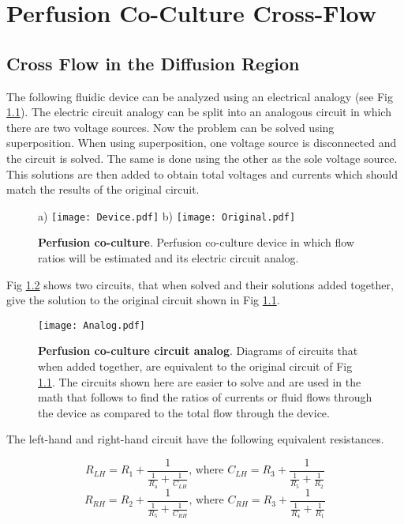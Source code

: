 \chapter{Perfusion Co-Culture Cross-Flow}
\label{App:PerfusionCoCulture}

\section{Cross Flow in the Diffusion Region}
The following fluidic device can be analyzed using an electrical analogy (see Fig \ref{App:PerfusionCulture:fig:device}). The electric circuit analogy can be split into an analogous circuit in which there are two voltage sources. Now the problem can be solved using superposition. When using superposition, one voltage source is disconnected and the circuit is solved. The same is done using the other as the sole voltage source. This solutions are then added to obtain total voltages and currents which should match the results of the original circuit. 

\begin{figure}[!ht]
\centering
a) \texttt{[image: Device.pdf]}     b) \texttt{[image: Original.pdf]}
\caption{\textbf{Perfusion co-culture}. Perfusion co-culture device in which flow ratios will be estimated and its electric circuit analog.}
\label{App:PerfusionCulture:fig:device}
\end{figure}

Fig \ref{fig:circuit} shows two circuits, that when solved and their solutions added together, give the solution to the original circuit shown in Fig \ref{App:PerfusionCulture:fig:device}.

\begin{figure}[!ht]
\centering
\texttt{[image: Analog.pdf]}
\caption{\textbf{Perfusion co-culture circuit analog}. Diagrams of circuits that when added together, are equivalent to the original circuit of Fig \ref{App:PerfusionCulture:fig:device}. The circuits shown here are easier to solve and are used in the math that follows to find the ratios of currents or fluid flows through the device as compared to the total flow through the device.}
\label{fig:circuit}
\end{figure}

The left-hand and right-hand circuit have the following equivalent resistances.

\begin{equation}
R_{LH} = R_{1} + \frac{1}{\frac{1}{R_{4}} + \frac{1}{C_{LH}}}\textrm{, where } C_{LH} = R_{3} + \frac{1}{\frac{1}{R_{5}} + \frac{1}{R_{2}}}
\end{equation}
\begin{equation}
R_{RH} = R_{2} + \frac{1}{\frac{1}{R_{5}} + \frac{1}{C_{RH}}} \textrm{, where } C_{RH} = R_{3} + \frac{1}{\frac{1}{R_{4}} + \frac{1}{R_{1}}}
\end{equation}

